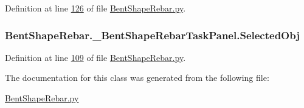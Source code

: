 Definition at line \hyperlink{BentShapeRebar_8py_source_l00126}{126} of file \hyperlink{BentShapeRebar_8py_source}{Bent\+Shape\+Rebar.\+py}.

\subsubsection[{\texorpdfstring{Selected\+Obj}{SelectedObj}}]{\setlength{\rightskip}{0pt plus 5cm}Bent\+Shape\+Rebar.\+\_\+\+Bent\+Shape\+Rebar\+Task\+Panel.\+Selected\+Obj}\hypertarget{classBentShapeRebar_1_1__BentShapeRebarTaskPanel_a24d363ab6c058ce4436a2b29e9c0b279}{}\label{classBentShapeRebar_1_1__BentShapeRebarTaskPanel_a24d363ab6c058ce4436a2b29e9c0b279}


Definition at line \hyperlink{BentShapeRebar_8py_source_l00109}{109} of file \hyperlink{BentShapeRebar_8py_source}{Bent\+Shape\+Rebar.\+py}.



The documentation for this class was generated from the following file\+:\begin{DoxyCompactItemize}
\item 
\hyperlink{BentShapeRebar_8py}{Bent\+Shape\+Rebar.\+py}\end{DoxyCompactItemize}

